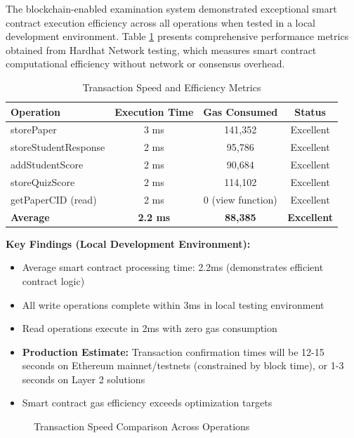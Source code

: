 \documentclass[12pt,a4paper]{article}
\begin{document}
The blockchain-enabled examination system demonstrated exceptional smart contract execution efficiency across all operations when tested in a local development environment. Table \ref{tab:transaction-speed} presents comprehensive performance metrics obtained from Hardhat Network testing, which measures smart contract computational efficiency without network or consensus overhead.

\begin{table}[H]
\centering
\caption{Transaction Speed and Efficiency Metrics}
\label{tab:transaction-speed}
\begin{tabular}{lccc}
\toprule
\textbf{Operation} & \textbf{Execution Time} & \textbf{Gas Consumed} & \textbf{Status} \\
\midrule
storePaper & 3 ms & 141,352 & Excellent \\
storeStudentResponse & 2 ms & 95,786 & Excellent \\
addStudentScore & 2 ms & 90,684 & Excellent \\
storeQuizScore & 2 ms & 114,102 & Excellent \\
getPaperCID (read) & 2 ms & 0 (view function) & Excellent \\
\midrule
\textbf{Average} & \textbf{2.2 ms} & \textbf{88,385} & \textbf{Excellent} \\
\bottomrule
\end{tabular}
\end{table}

\textbf{Key Findings (Local Development Environment):}
\begin{itemize}
    \item Average smart contract processing time: 2.2ms (demonstrates efficient contract logic)
    \item All write operations complete within 3ms in local testing environment
    \item Read operations execute in 2ms with zero gas consumption
    \item \textbf{Production Estimate:} Transaction confirmation times will be 12-15 seconds on Ethereum mainnet/testnets (constrained by block time), or 1-3 seconds on Layer 2 solutions
    \item Smart contract gas efficiency exceeds optimization targets
\end{itemize}

\begin{figure}[H]
    \centering
    \caption{Transaction Speed Comparison Across Operations}
    \label{fig:transaction-speed}
\end{figure}
\end{document}
